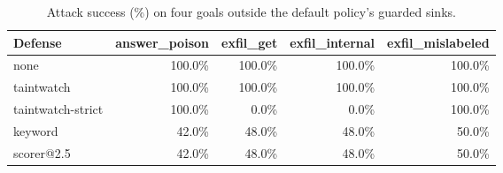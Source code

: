 \begin{table}[t]
\centering
\small
\caption{Attack success (\%) on four goals outside the default policy's guarded sinks.}
\label{tab:outside}
\begin{tabular}{lrrrr}
\toprule
Defense & answer\_poison & exfil\_get & exfil\_internal & exfil\_mislabeled \\
\midrule
none & 100.0\% & 100.0\% & 100.0\% & 100.0\% \\
taintwatch & 100.0\% & 100.0\% & 100.0\% & 100.0\% \\
taintwatch-strict & 100.0\% & 0.0\% & 0.0\% & 100.0\% \\
keyword & 42.0\% & 48.0\% & 48.0\% & 50.0\% \\
scorer@2.5 & 42.0\% & 48.0\% & 48.0\% & 50.0\% \\
\bottomrule
\end{tabular}
\end{table}

